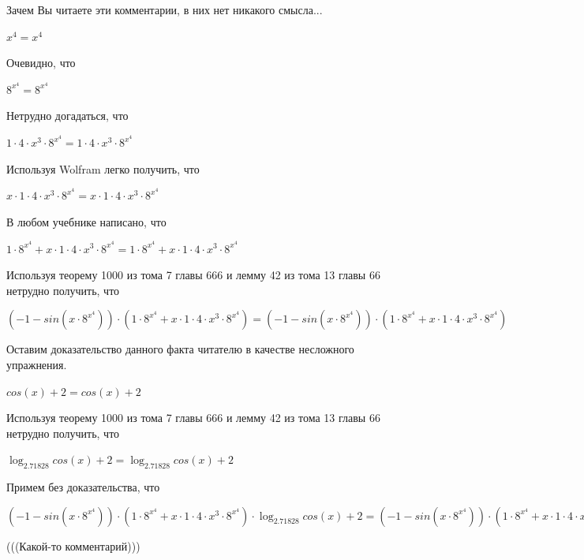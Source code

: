 \documentclass[12pt,a4paper,fleqn]{article}
\theoremstyle{definition}
\begin{document}
Зачем Вы читаете эти комментарии, в них нет никакого смысла... 

${ x }^{ 4 } = { x }^{ 4 }$

Очевидно, что 

${ 8 }^{{ x }^{ 4 }} = { 8 }^{{ x }^{ 4 }}$

Нетрудно догадаться, что 

$ 1  \cdot  4  \cdot { x }^{ 3 } \cdot { 8 }^{{ x }^{ 4 }} =  1  \cdot  4  \cdot { x }^{ 3 } \cdot { 8 }^{{ x }^{ 4 }}$

Используя Wolfram легко получить, что 

$ x  \cdot  1  \cdot  4  \cdot { x }^{ 3 } \cdot { 8 }^{{ x }^{ 4 }} =  x  \cdot  1  \cdot  4  \cdot { x }^{ 3 } \cdot { 8 }^{{ x }^{ 4 }}$

В любом учебнике написано, что 

$ 1  \cdot { 8 }^{{ x }^{ 4 }} +  x  \cdot  1  \cdot  4  \cdot { x }^{ 3 } \cdot { 8 }^{{ x }^{ 4 }} =  1  \cdot { 8 }^{{ x }^{ 4 }} +  x  \cdot  1  \cdot  4  \cdot { x }^{ 3 } \cdot { 8 }^{{ x }^{ 4 }}$

Используя теорему 1000 из тома 7 главы 666 и лемму 42 из тома 13 главы 66 нетрудно получить, что 

$( -1  - sin( x  \cdot { 8 }^{{ x }^{ 4 }})) \cdot ( 1  \cdot { 8 }^{{ x }^{ 4 }} +  x  \cdot  1  \cdot  4  \cdot { x }^{ 3 } \cdot { 8 }^{{ x }^{ 4 }}) = ( -1  - sin( x  \cdot { 8 }^{{ x }^{ 4 }})) \cdot ( 1  \cdot { 8 }^{{ x }^{ 4 }} +  x  \cdot  1  \cdot  4  \cdot { x }^{ 3 } \cdot { 8 }^{{ x }^{ 4 }})$

Оставим доказательство данного факта читателю в качестве несложного упражнения. 

$cos( x ) +  2  = cos( x ) +  2 $

Используя теорему 1000 из тома 7 главы 666 и лемму 42 из тома 13 главы 66 нетрудно получить, что 

$\log_{ 2.71828 }{cos( x ) +  2 } = \log_{ 2.71828 }{cos( x ) +  2 }$

Примем без доказательства, что 

$( -1  - sin( x  \cdot { 8 }^{{ x }^{ 4 }})) \cdot ( 1  \cdot { 8 }^{{ x }^{ 4 }} +  x  \cdot  1  \cdot  4  \cdot { x }^{ 3 } \cdot { 8 }^{{ x }^{ 4 }}) \cdot \log_{ 2.71828 }{cos( x ) +  2 } = ( -1  - sin( x  \cdot { 8 }^{{ x }^{ 4 }})) \cdot ( 1  \cdot { 8 }^{{ x }^{ 4 }} +  x  \cdot  1  \cdot  4  \cdot { x }^{ 3 } \cdot { 8 }^{{ x }^{ 4 }}) \cdot \log_{ 2.71828 }{cos( x ) +  2 }$

(((Какой-то комментарий))) 
\end{document}
